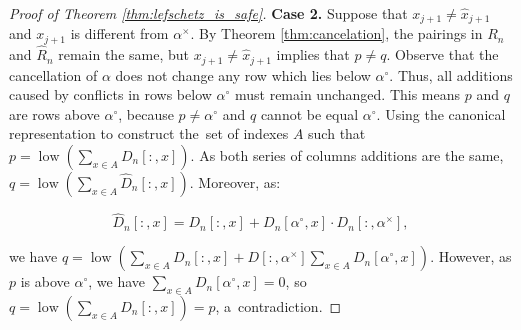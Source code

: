 \documentclass[a4paper,12pt, USenglish,cleveref,autoref,thm-restate]{article}
\DeclareMathOperator{\low}{low}
\newcommand{\mB}{D}
\newcommand{\hmB}{D}
\newcommand{\hmBaft}{\hat{\mB}}
\newcommand{\hmR}{R}
\newcommand{\cx}{x}
\newcommand{\cp}{p}
\newcommand{\cq}{q}
\newcommand{\bth}[1]{#1^\circ}
\newcommand{\dth}[1]{#1^{\!\times}}
\newcommand{\bds}{\alpha}
\begin{document}
\begin{appendices}
\begin{proof}[Proof of Theorem \ref{thm:lefschetz_is_safe}]

\noindent \textbf{Case 2.}
Suppose that $x_{j+1} \neq \hat{x}_{j+1}$ and $x_{j+1}$ is different from $\dth\bds$.
By Theorem \ref{thm:cancelation}, the pairings in $\hmR_n$ and $\hat{\hmR}_n$ remain the same,
    but $x_{j+1} \neq \hat{x}_{j+1}$ implies that $p \neq q$. 
    Observe that the cancellation of $\bds$ does not change any row which lies below $\bth\bds$.
    Thus, all additions caused by conflicts in rows below $\bth\bds$ must remain unchanged.
    This means $p$ and $q$ are rows above $\bth\bds$, because $p \neq \bth\bds$ and $q$ cannot be equal $\bth\bds$.
    Using the canonical representation to construct the~set of indexes $A$ such that $\cp = \low \left(\sum\limits_{\cx \in A} \hmB_n[:,\cx]\right)$. 
    As both series of columns additions are the same,
        $\cq = \low \left( \sum\limits_{\cx \in A}\hmBaft_n[:,x] \right)$. 
    Moreover, as:
    
    \[\hmBaft_n[:,x] = \hmB_n[:,x] + \hmB_n[\bth\bds,x] \cdot \hmB_n[:,\dth\bds],\] 
    
    \noindent we have $ \cq  = \low \left( \sum\limits_{x \in A}\hmB_n[:,x] + \hmB[:,\dth\bds]\sum\limits_{x \in A}\hmB_n[\bth\bds,x] \right)$. However, as $p$ is above $\bth\bds$, we have $  \sum\limits_{\cx \in A} \hmB_n[\bth\bds,\cx] = 0$, so $q = \low \left(\sum\limits_{\cx \in A} \hmB_n[:,\cx]\right) = p$, a~contradiction. 


\end{proof}
\end{appendices}
\end{document}

